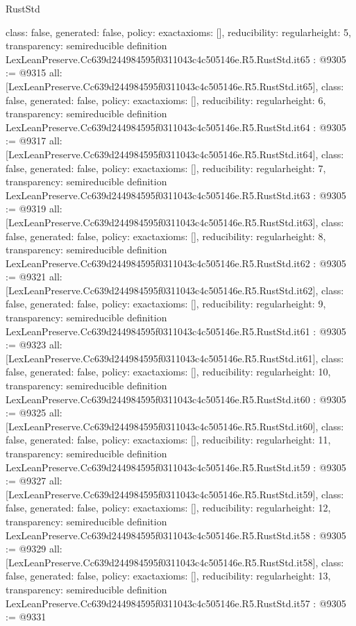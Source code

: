 \begin{lexlean}{RustStd}
\begin{coremodule}
{  class: false,
  generated: false,
  policy: exact{axioms: []},
  reducibility: regular{height: 5},
  transparency: semireducible
}
definition LexLeanPreserve.Cc639d244984595f0311043c4c505146e.R5.RustStd.it65 : @9305 := @9315 {
  all: [LexLeanPreserve.Cc639d244984595f0311043c4c505146e.R5.RustStd.it65],
  class: false,
  generated: false,
  policy: exact{axioms: []},
  reducibility: regular{height: 6},
  transparency: semireducible
}
definition LexLeanPreserve.Cc639d244984595f0311043c4c505146e.R5.RustStd.it64 : @9305 := @9317 {
  all: [LexLeanPreserve.Cc639d244984595f0311043c4c505146e.R5.RustStd.it64],
  class: false,
  generated: false,
  policy: exact{axioms: []},
  reducibility: regular{height: 7},
  transparency: semireducible
}
definition LexLeanPreserve.Cc639d244984595f0311043c4c505146e.R5.RustStd.it63 : @9305 := @9319 {
  all: [LexLeanPreserve.Cc639d244984595f0311043c4c505146e.R5.RustStd.it63],
  class: false,
  generated: false,
  policy: exact{axioms: []},
  reducibility: regular{height: 8},
  transparency: semireducible
}
definition LexLeanPreserve.Cc639d244984595f0311043c4c505146e.R5.RustStd.it62 : @9305 := @9321 {
  all: [LexLeanPreserve.Cc639d244984595f0311043c4c505146e.R5.RustStd.it62],
  class: false,
  generated: false,
  policy: exact{axioms: []},
  reducibility: regular{height: 9},
  transparency: semireducible
}
definition LexLeanPreserve.Cc639d244984595f0311043c4c505146e.R5.RustStd.it61 : @9305 := @9323 {
  all: [LexLeanPreserve.Cc639d244984595f0311043c4c505146e.R5.RustStd.it61],
  class: false,
  generated: false,
  policy: exact{axioms: []},
  reducibility: regular{height: 10},
  transparency: semireducible
}
definition LexLeanPreserve.Cc639d244984595f0311043c4c505146e.R5.RustStd.it60 : @9305 := @9325 {
  all: [LexLeanPreserve.Cc639d244984595f0311043c4c505146e.R5.RustStd.it60],
  class: false,
  generated: false,
  policy: exact{axioms: []},
  reducibility: regular{height: 11},
  transparency: semireducible
}
definition LexLeanPreserve.Cc639d244984595f0311043c4c505146e.R5.RustStd.it59 : @9305 := @9327 {
  all: [LexLeanPreserve.Cc639d244984595f0311043c4c505146e.R5.RustStd.it59],
  class: false,
  generated: false,
  policy: exact{axioms: []},
  reducibility: regular{height: 12},
  transparency: semireducible
}
definition LexLeanPreserve.Cc639d244984595f0311043c4c505146e.R5.RustStd.it58 : @9305 := @9329 {
  all: [LexLeanPreserve.Cc639d244984595f0311043c4c505146e.R5.RustStd.it58],
  class: false,
  generated: false,
  policy: exact{axioms: []},
  reducibility: regular{height: 13},
  transparency: semireducible
}
definition LexLeanPreserve.Cc639d244984595f0311043c4c505146e.R5.RustStd.it57 : @9305 := @9331 {
}
\end{coremodule}
\end{lexlean}
